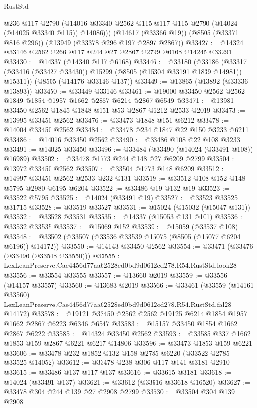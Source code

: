 \begin{lexlean}{RustStd}
\begin{coremodule}
        @236
        @117
        @2790
        (@14016 @33340 @2562 @115 @117 @115 @2790 (@14024 (@14025 @33340 @115)) @14086)))
    (@14617 (@33366 @19))
    (@8505 (@33371 @816 @296))
    (@13949 (@33378 @296 @197 @2897 @2867))
@33427 := @14324 @33146 @2562 @266 @117 @244 @27 @2867 @2799 @6168 @14245 @33291
@33430 := @14337 (@14340 @117 @6168)
@33446 := @33180
    (@33186 (@33317 (@33416 (@33427 @33430)) @15299 (@8505 (@15304 @33191 @1839 @14981)) @15311))
    (@8505 (@14176 @33146 @137))
@33449 := @13865 (@13892 (@33336 @13893))
@33450 := @33449 @33146
@33461 := @19000 @33450 @2562 @2562 @1849 @1854 @1957 @1662 @2867 @6214 @2867 @6549
@33471 := @13981 @33450 @2562 @1845 @1848 @151 @53 @2867 @6212 @2533 @2019
@33473 := @13995 @33450 @2562
@33476 := @33473 @1848 @151 @6212
@33478 := @14004 @33450 @2562
@33484 := @33478 @234 @1847 @22 @150 @3233 @6211
@33486 := @14016 @33450 @2562
@33490 := @33486 @108 @22 @108 @3233
@33491 := @14025 @33450
@33496 := @33484 (@33490 (@14024 (@33491 @108)) @16989)
@33502 := @33478 @1773 @244 @148 @27 @6209 @2799
@33504 := @13972 @33450 @2562
@33507 := @33504 @1773 @148 @6209
@33512 := @14997 @33450 @2562 @2533 @232 @131
@33519 := @33512 @108 @152 @148 @5795 @2980 @6195 @6204
@33522 := @33486 @19 @132 @19
@33523 := @33522 @5795
@33525 := @14024 (@33491 @19)
@33527 := @33523 @33525 @31715
@33528 := @33519 @33527
@33531 := @15024 (@15032 (@15047 @131))
@33532 := @33528 @33531
@33535 := @14337 (@15053 @131 @101)
@33536 := @33532 @33535
@33537 := @15069 @152
@33539 := @15059 (@33537 @108)
@33548 := @33502 (@33507 (@33536 @33539 @15075 (@8505 (@15077 @6204 @6196)) @14172))
@33550 := @14143 @33450 @2562
@33554 := @33471 (@33476 (@33496 (@33548 @33550)))
@33555 := LexLeanPreserve.Cae4456d77aa62528ed0bd9d0612cd278.R54.RustStd.look28
@33556 := @33554 @33555
@33557 := @13660 @2019
@33559 := @33556 (@14157 @33557)
@33560 := @13683 @2019
@33566 := @33461
    (@33559
      (@14161 @33560)
      LexLeanPreserve.Cae4456d77aa62528ed0bd9d0612cd278.R54.RustStd.fal28
      @14172)
@33578 := @19121 @33450 @2562 @2562 @19125 @6214 @1854 @1957 @1662 @2867 @6223 @6346 @6547
@33583 := @15157 @33450 @1854 @1662 @2867 @6222
@33585 := @14324 @33450 @2562
@33593 := @33585 @337 @1662 @1853 @159 @2867 @6221 @6217 @14806
@33596 := @33473 @1853 @159 @6221
@33606 := @33478 @232 @1852 @132 @158 @2785 @6220 (@33522 @2785 @33525 @14052)
@33612 := @33478 @238 @306 @117 @141 @3181 @2910
@33615 := @33486 @137 @117 @137
@33616 := @33615 @3181
@33618 := @14024 (@33491 @137)
@33621 := @33612 (@33616 @33618 @16520)
@33627 := @33478 @304 @244 @139 @27 @2908 @2799
@33630 := @33504 @304 @139 @2908

\end{coremodule}
\end{lexlean}
